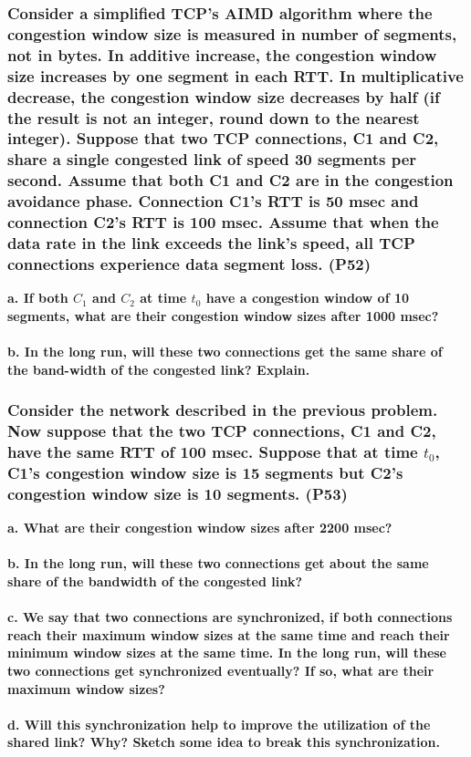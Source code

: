 \subsubsection{Consider a simplified TCP's AIMD algorithm where the congestion window size is measured in number of segments, not in bytes. In additive increase, the congestion window size increases by one segment in each RTT. In multiplicative decrease, the congestion window size decreases by half (if the result is not an integer, round down to the nearest integer). Suppose that two TCP connections, C1 and C2, share a single congested link of speed 30 segments per second. Assume that both C1 and C2 are in the congestion avoidance phase. Connection C1's RTT is 50 msec and connection C2's RTT is 100 msec. Assume that when the data rate in the link exceeds the link's speed, all  TCP connections experience data segment loss. (P52)}

\textbf{a. If both $C_1$ and $C_2$ at time $t_0$ have a congestion window of 10 segments, what are their congestion window sizes after 1000 msec?} \\
\\
\textbf{b. In the long run, will these two connections get the same share of the band-width of the congested link? Explain.}


\subsubsection{Consider the network described in the previous problem. Now suppose that the two TCP connections, C1 and C2, have the same RTT of 100 msec.  Suppose that at time $t_0$, C1's congestion window size is 15 segments but C2's congestion window size is 10 segments. (P53)}

\textbf{a. What are their congestion window sizes after 2200 msec?} \\
\\
\textbf{b. In the long run, will these two connections get about the same share of the bandwidth of the congested link?} \\
\\
\textbf{c. We say that two connections are synchronized, if both connections reach their maximum window sizes at the same time and reach their minimum window sizes at the same time. In the long run, will these two connections get synchronized eventually? If so, what are their maximum window sizes?} \\
\\
\textbf{d. Will this synchronization help to improve the utilization of the shared link? Why? Sketch some idea to break this synchronization.} \\


